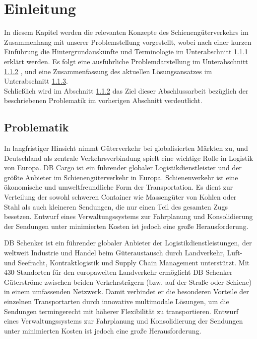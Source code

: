 \chapter{Einleitung}
In diesem Kapitel werden die relevanten Konzepte des Schienengüterverkehrs im Zusammenhang mit unserer Problemstellung vorgestellt, wobei nach einer kurzen Einführung die Hintergrundauskünfte und Terminologie im Unterabschnitt \hyperref[sec:problem]{1.1.1} erklärt werden. Es folgt eine ausführliche Problemdarstellung im Unterabschnitt \hyperref[sec:discription]{1.1.2} , und eine Zusammenfassung des aktuellen Lösungsansatzes im Unterabschnitt \hyperref[sec:current]{1.1.3}.\\
Schließlich wird im Abschnitt \hyperref[sec:Ziel]{1.1.2} das Ziel dieser Abschlussarbeit bezüglich der beschriebenen Problematik im vorherigen Abschnitt verdeutlicht.

\section{Problematik}
\label{sec:problem}
In langfristiger Hinsicht nimmt Güterverkehr bei globalisierten Märkten zu, und Deutschland als zentrale Verkehrsverbindung spielt eine wichtige Rolle in Logistik von Europa. DB Cargo ist ein führender globaler Logistikdienstleister und der größte Anbieter im Schienengüterverkehr in Europa. Schienenverkehr ist eine ökonomische und umweltfreundliche Form der Transportation. Es dient zur Verteilung der sowohl schweren Container wie Massengüter von Kohlen oder Stahl als auch kleineren Sendungen, die nur einen Teil des gesamten Zugs besetzen. Entwurf eines Verwaltungssystems zur Fahrplanung und Konsolidierung der Sendungen unter minimierten Kosten ist jedoch eine große Herausforderung.

 DB Schenker ist ein führender globaler Anbieter der Logistikdienstleistungen, der weltweit Industrie und Handel beim Güteraustausch durch Landverkehr, Luft- und Seefracht, Kontraktlogistik und Supply Chain Management unterstützt. Mit 430 Standorten für den europaweiten Landverkehr ermöglicht DB Schenker Güterströme zwischen beiden Verkehrsträgern (bzw. auf der Straße oder Schiene) in einem umfassenden Netzwerk. Damit verbindet er die besonderen Vorteile der einzelnen Transportarten durch innovative multimodale Lösungen, um die Sendungen termingerecht mit höherer Flexibilität zu transportieren. Entwurf eines Verwaltungssystems zur Fahrplanung und Konsolidierung der Sendungen unter minimierten Kosten ist jedoch eine große Herausforderung.

